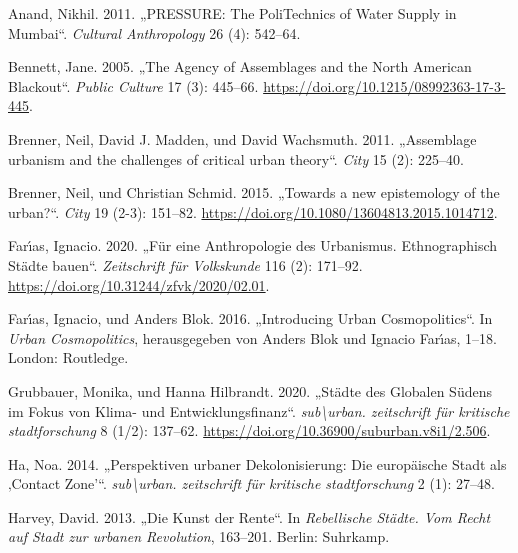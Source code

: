 \documentclass[
  ngerman,
]{article}
\newlength{\cslhangindent}
\newlength{\cslentryspacingunit} %
\newenvironment{CSLReferences}[2] %
 {%
  \setlength{\parindent}{0pt}
  \ifodd #1
  \let\oldpar\par
  \def\par{\hangindent=\cslhangindent\oldpar}
  \fi
  \setlength{\parskip}{#2\cslentryspacingunit}
 }%
 {}
\begin{document}
\hypertarget{refs}{}
\begin{CSLReferences}{1}{0}
\leavevmode{}%
Anand, Nikhil. 2011. {„PRESSURE: The PoliTechnics of Water Supply in Mumbai``}. \emph{Cultural Anthropology} 26 (4): 542--64.

\leavevmode{}%
Bennett, Jane. 2005. {„The Agency of Assemblages and the North American Blackout``}. \emph{Public Culture} 17 (3): 445--66. \url{https://doi.org/10.1215/08992363-17-3-445}.

\leavevmode{}%
Brenner, Neil, David J. Madden, und David Wachsmuth. 2011. {„Assemblage urbanism and the challenges of critical urban theory``}. \emph{City} 15 (2): 225--40.

\leavevmode{}%
Brenner, Neil, und Christian Schmid. 2015. {„Towards a new epistemology of the urban?``}. \emph{City} 19 (2-3): 151--82. \url{https://doi.org/10.1080/13604813.2015.1014712}.

\leavevmode{}%
Farı́as, Ignacio. 2020. {„F{ü}r eine Anthropologie des Urbanismus. Ethnographisch St{ä}dte bauen``}. \emph{Zeitschrift f{ü}r Volkskunde} 116 (2): 171--92. \url{https://doi.org/10.31244/zfvk/2020/02.01}.

\leavevmode{}%
Farı́as, Ignacio, und Anders Blok. 2016. {„Introducing Urban Cosmopolitics``}. In \emph{Urban Cosmopolitics}, herausgegeben von Anders Blok und Ignacio Farı́as, 1--18. London: Routledge.

\leavevmode{}%
Grubbauer, Monika, und Hanna Hilbrandt. 2020. {„St{ä}dte des Globalen S{ü}dens im Fokus von Klima- und Entwicklungsfinanz``}. \emph{sub\textbackslash urban. zeitschrift f{ü}r kritische stadtforschung} 8 (1/2): 137--62. \url{https://doi.org/10.36900/suburban.v8i1/2.506}.

\leavevmode{}%
Ha, Noa. 2014. {„Perspektiven urbaner Dekolonisierung: Die europ{ä}ische Stadt als ‚Contact Zone'``}. \emph{sub\textbackslash urban. zeitschrift f{ü}r kritische stadtforschung} 2 (1): 27--48.

\leavevmode{}%
Harvey, David. 2013. {„Die Kunst der Rente``}. In \emph{Rebellische St{ä}dte. Vom Recht auf Stadt zur urbanen Revolution}, 163--201. Berlin: Suhrkamp.


\end{CSLReferences}
\end{document}
